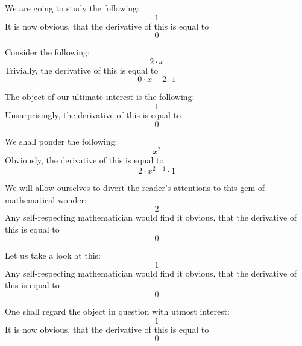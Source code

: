 \documentclass{article}
\begin{document}
We are going to study the following:
\begin{equation}
1 
\end{equation}
It is now obvious, that the derivative of this is equal to
\begin{equation}
0 
\end{equation}

Consider the following:
\begin{equation}
2 \cdot x 
\end{equation}
Trivially, the derivative of this is equal to
\begin{equation}
0 \cdot x + 2 \cdot 1 
\end{equation}

The object of our ultimate interest is the following:
\begin{equation}
1 
\end{equation}
Unsurprisingly, the derivative of this is equal to
\begin{equation}
0 
\end{equation}

We shall ponder the following:
\begin{equation}
x ^{2 } 
\end{equation}
Obviously, the derivative of this is equal to
\begin{equation}
2 \cdot x ^{2 - 1 } \cdot 1 
\end{equation}

We will allow ourselves to divert the reader's attentions to this gem of mathematical wonder:
\begin{equation}
2 
\end{equation}
Any self-respecting mathematician would find it obvious, that the derivative of this is equal to
\begin{equation}
0 
\end{equation}

Let us take a look at this:
\begin{equation}
1 
\end{equation}
Any self-respecting mathematician would find it obvious, that the derivative of this is equal to
\begin{equation}
0 
\end{equation}

One shall regard the object in question with utmost interest:
\begin{equation}
1 
\end{equation}
It is now obvious, that the derivative of this is equal to
\begin{equation}
0 
\end{equation}
\end{document}
